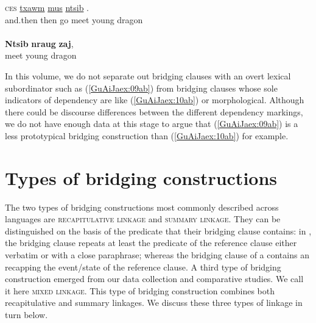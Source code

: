 \documentclass[output=paper]{LSP/langsci}
\begin{document}
\begin{exe}
\ex \label{GuAiJaex:10ab}
\begin{xlist}
\ex \label{GuAiJaex:10a}
\gll \textsc{ces} \underline{txawm} \underline{mus} \underline{ntsib} \underline{} \underline{}.\\
and.then then go meet young dragon\\ 
\glt {}\\
\ex \label{GuAiJaex:10b}
\gll \textbf{Ntsib} \textbf{nraug} \textbf{zaj},\\		
 meet young dragon \\ 
\glt {}
\end{xlist}
\end{exe}

In this volume, we do not separate out bridging clauses with an overt lexical subordinator such as (\ref{GuAiJaex:09ab}) from bridging clauses whose sole indicators of dependency are  like (\ref{GuAiJaex:10ab}) or morphological. Although there could be discourse differences between the different dependency markings, we do not have enough data at this stage to argue that (\ref{GuAiJaex:09ab}) is a less prototypical bridging construction than (\ref{GuAiJaex:10ab}) for example.

\section{Types of bridging constructions} 
\label{GuAi3types}
The two types of bridging constructions most commonly described across languages are \textsc{recapitulative linkage} and \textsc{summary linkage}. They can be distinguished on the basis of the predicate that their bridging clause contains: in , the bridging clause repeats at least the predicate of the reference clause either verbatim or with a close paraphrase; whereas the bridging clause of a  contains an  recapping the event/state of the reference clause. A third type of bridging construction emerged from our data collection and comparative studies. We call it here \textsc{mixed linkage}. This type of bridging construction combines both recapitulative and summary linkages. We discuss these three types of linkage in turn below.
\end{document}
